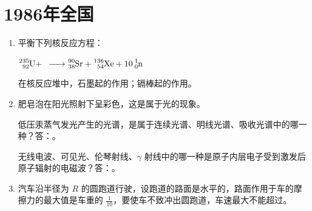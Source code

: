 \documentclass[\gkver]{gaokaozhenti}
\begin{document}
\chapter{1986年全国}

\begin{enumerate}
\item
平衡下列核反应方程：

$\ce{^{235}_{92}U} +$  $\ce{-> ^{90}_{38}Sr + ^{136}_{54}Xe + 10^{1}_{0}n}$

在核反应堆中，石墨起的作用；镉棒起的作用。


\item
肥皂泡在阳光照射下呈彩色，这是属于光的现象。

低压汞蒸气发光产生的光谱，是属于连续光谱、明线光谱、吸收光谱中的哪一种？答：。

无线电波、可见光、伦琴射线、$\gamma$ 射线中的哪一种是原子内层电子受到激发后原子辐射的电磁波？答：。


\item
汽车沿半径为 $R$ 的圆跑道行驶，设跑道的路面是水平的，路面作用于车的摩擦力的最大值是车重的 $\frac{1}{10}$，要使车不致冲出圆跑道，车速最大不能超过。



\end{enumerate}
\end{document}
